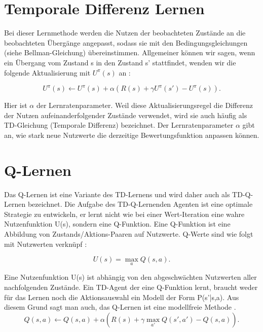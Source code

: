 \section{Temporale Differenz Lernen}
\label{sec:Temporale Differenz Lernen}
Bei dieser Lernmethode werden die Nutzen der beobachteten Zustände an die beobachteten Übergänge angepasst, sodass sie mit den Bedingungsgleichungen (siehe Bellman-Gleichung) übereinstimmen. Allgemeiner können wir sagen, wenn ein Übergang vom Zustand s in den Zustand s' stattfindet, wenden wir die folgende Aktualisierung mit $U^\pi(s)$ an \cite[966\psq]{Russell}:

\begin{equation}
\label{eq:Aktualisierungsgleichung temporale Differenz}
U^\pi(s) \leftarrow U^\pi(s) + \alpha(R(s) + \gamma U^\pi(s') - U^\pi(s)).
\end{equation}

Hier ist $\alpha$ der Lernratenparameter. Weil diese Aktualisierungsregel die Differenz der Nutzen aufeinanderfolgender Zustände verwendet, wird sie auch häufig als TD-Gleichung (Temporale Differenz) bezeichnet. Der Lernratenparameter $\alpha$ gibt an, wie stark neue Nutzwerte die derzeitige Bewertungsfunktion anpassen können. 

\section{Q-Lernen}
\label{sec:Q-Lernen}
Das Q-Lernen ist eine Variante des TD-Lernens und wird daher auch als TD-Q-Lernen bezeichnet. Die Aufgabe des TD-Q-Lernenden Agenten ist eine optimale Strategie zu entwickeln, er lernt nicht wie bei einer Wert-Iteration eine wahre Nutzenfunktion U(s), sondern eine Q-Funktion. Eine Q-Funktion ist eine Abbildung von Zustands/Aktions-Paaren auf Nutzwerte. Q-Werte sind wie folgt mit Nutzwerten verknüpf \cite[973]{Russell}:

\begin{equation}
\label{eq:Nutzenwerte und Q-Werte}
U(s) = \max_a Q(s,a).
\end{equation}

Eine Nutzenfunktion U(s) ist abhängig von den abgeschwächten Nutzwerten aller nachfolgenden Zustände. Ein TD-Agent der eine Q-Funktion lernt, braucht weder für das Lernen noch die Aktionsauswahl ein Modell der Form P(s'|s,a). Aus diesem Grund sagt man auch, das Q-Lernen ist eine modellfreie Methode \cite[974]{Russell}. \\

\begin{equation}
Q(s,a) \leftarrow Q(s,a) + \alpha(R(s) + \gamma \max_{a'} Q(s',a') - Q(s,a)).
\end{equation}

